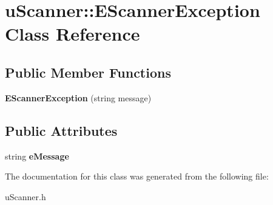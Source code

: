 \hypertarget{classu_scanner_1_1_e_scanner_exception}{\section{u\-Scanner\-:\-:E\-Scanner\-Exception Class Reference}
\label{classu_scanner_1_1_e_scanner_exception}
}
\subsection*{Public Member Functions}
\begin{DoxyCompactItemize}
\item 
\hypertarget{classu_scanner_1_1_e_scanner_exception_a5fdb46d9167ee6718fceda770b9dbb07}{{\bfseries E\-Scanner\-Exception} (string message)}\label{classu_scanner_1_1_e_scanner_exception_a5fdb46d9167ee6718fceda770b9dbb07}

\end{DoxyCompactItemize}
\subsection*{Public Attributes}
\begin{DoxyCompactItemize}
\item 
\hypertarget{classu_scanner_1_1_e_scanner_exception_ab1e1638d8b05e72aaf07c7877a041bba}{string {\bfseries e\-Message}}\label{classu_scanner_1_1_e_scanner_exception_ab1e1638d8b05e72aaf07c7877a041bba}

\end{DoxyCompactItemize}


The documentation for this class was generated from the following file\-:\begin{DoxyCompactItemize}
\item 
u\-Scanner.\-h\end{DoxyCompactItemize}
